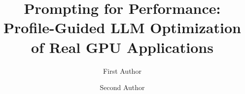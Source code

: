 \documentclass[acmsmall,review]{acmart}

\usepackage{multirow}
\usepackage{xspace}
\usepackage{amssymb}
\usepackage{tikz}
\usetikzlibrary{arrows.meta,positioning,calc}
\newcommand{\cmark}{\checkmark}
\newcommand{\xmark}{$\times$}
\newcommand{\tzi}[1]{\textcolor{red}{FIX: #1}\xspace}
\newcommand{\needcheck}[1]{\textcolor{blue}{[CHECK: #1]}\xspace}




\title{Prompting for Performance: Profile-Guided LLM Optimization of Real GPU Applications}

\author{First Author}

\author{Second Author}

\renewcommand{\shortauthors}{First Author and Second Author}

\begin{abstract}

\end{abstract}

